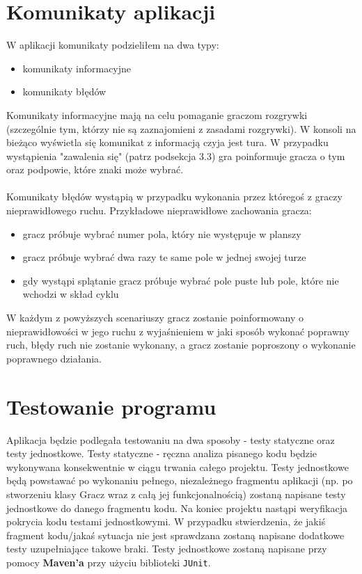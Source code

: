 \documentclass{article}
\begin{document}
\section{Komunikaty aplikacji}
W aplikacji komunikaty podzieliłem na dwa typy:
\begin{itemize}
    \item komunikaty informacyjne
    \item komunikaty błędów
\end{itemize}
Komunikaty informacyjne mają na celu pomaganie graczom rozgrywki (szczególnie tym, którzy nie są zaznajomieni z zasadami rozgrywki). W konsoli na bieżąco wyświetla się komunikat z informacją czyja jest tura. W przypadku wystąpienia "zawalenia się" (patrz podsekcja 3.3) gra poinformuje gracza o tym oraz podpowie, które znaki może wybrać.
\\ \\
Komunikaty błędów wystąpią w przypadku wykonania przez któregoś z graczy nieprawidłowego ruchu. Przykładowe nieprawidłowe zachowania gracza:
\begin{itemize}
    \item gracz próbuje wybrać numer pola, który nie występuje w planszy
    \item gracz próbuje wybrać dwa razy te same pole w jednej swojej turze
    \item gdy wystąpi splątanie gracz próbuje wybrać pole puste lub pole, które nie wchodzi w skład cyklu
\end{itemize}
W każdym z powyższych scenariuszy gracz zostanie poinformowany o nieprawidłowości w jego ruchu z wyjaśnieniem w jaki sposób wykonać poprawny ruch, błędy ruch nie zostanie wykonany, a gracz zostanie poproszony o wykonanie poprawnego działania.


\section{Testowanie programu}
Aplikacja będzie podlegała testowaniu na dwa sposoby - testy statyczne oraz testy jednostkowe. Testy statyczne - ręczna analiza pisanego kodu będzie wykonywana konsekwentnie w ciągu trwania całego projektu. Testy jednostkowe będą powstawać po wykonaniu pełnego, niezależnego fragmentu aplikacji (np. po stworzeniu klasy Gracz wraz z całą jej funkcjonalnością) zostaną napisane testy jednostkowe do danego fragmentu kodu. Na koniec projektu nastąpi weryfikacja pokrycia kodu testami jednostkowymi. W przypadku stwierdzenia, że jakiś fragment kodu/jakaś sytuacja nie jest sprawdzana zostaną napisane dodatkowe testy uzupełniające takowe braki. Testy jednostkowe zostaną napisane przy pomocy \textbf{Maven'a} przy użyciu biblioteki \texttt{JUnit}.
\end{document}
